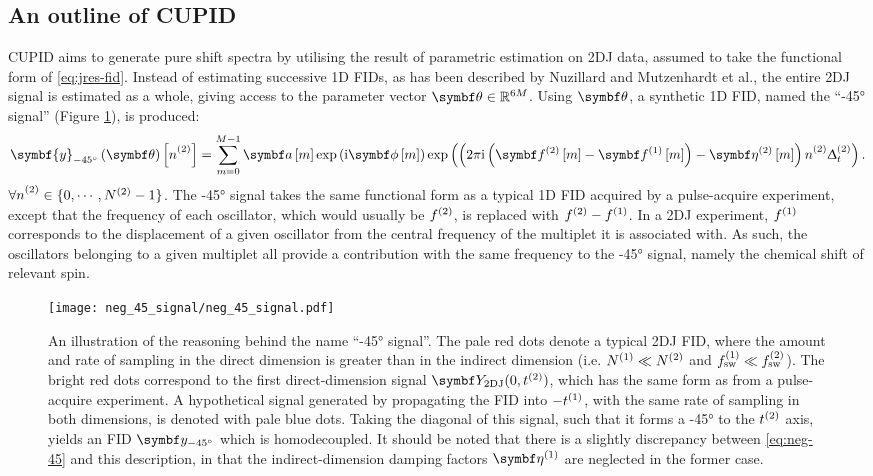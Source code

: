 \subsection{An outline of \acs{CUPID}}
\ac{CUPID} aims to generate pure shift spectra by utilising the result of
parametric estimation on \ac{2DJ} data, assumed to take the functional form of
\eqref{eq:jres-fid}.
Instead of estimating successive \ac{1D} \acp{FID}, as has been described by
Nuzillard and Mutzenhardt et al., the entire \ac{2DJ} signal is estimated as a
whole, giving access to the parameter vector $\bth \in \mathbb{R}^{6M}$. Using
$\bth$, a synthetic \ac{1D} \ac{FID}, named the ``\ang{-45} signal'' (Figure
\ref{fig:neg-45}), is produced:
\begin{equation}
    \symbf{y}_{\ang{-45}}\left(\bth\right)\left[ \ntwo \right] =
        \sum_{m=0}^{M-1} \bdam \exp \left(\iu \bdphim \right)
        \exp\left(
            \left(
                2 \pi \iu \left(\bdftwom - \bdfonem\right)
                - \bdetatwom
            \right) \ntwo \Dttwo
        \right).
    \label{eq:neg-45}
\end{equation}
$\forall \ntwo \in \lbrace 0, \cdots, \Ntwo - 1 \rbrace$. The \ang{-45} signal
takes the same functional form as a typical \ac{1D}
\ac{FID} acquired by a pulse-acquire experiment, except that the frequency of
each oscillator, which would usually be $f^{(2)}$, is replaced with $f^{(2)} -
f^{(1)}$. In a \ac{2DJ} experiment, $f^{(1)}$ corresponds to the displacement of a
given oscillator from the central frequency of the multiplet it is associated
with. As such, the oscillators belonging to a given multiplet all provide
a contribution with the same frequency to the \ang{-45} signal, namely the
chemical shift of relevant spin.
\begin{figure}
    \centering
    \texttt{[image: neg\_45\_signal/neg\_45\_signal.pdf]}
    \caption{
        An illustration of the reasoning behind the name ``\ang{-45}
        signal''. The pale red dots denote a typical \ac{2DJ} \ac{FID}, where
        the amount and rate of sampling in the direct dimension is greater than
        in the indirect dimension (i.e. $N^{(1)} \ll N^{(2)}$ and $f_{\mathrm{sw}}^{(1)} \ll
        f_{\mathrm{sw}}^{(2)}$). The bright red dots correspond to the first direct-dimension
        signal $\bY_{\text{2DJ}}(0, \ttwo)$, which has the same form as
         from a pulse-acquire experiment. A hypothetical signal
        generated by propagating the \ac{FID} into $-t^{(1)}$, with the same rate
        of sampling in both dimensions, is denoted with pale blue dots. Taking
        the diagonal of this signal, such that it forms a \ang{-45} to the
        $t^{(2)}$ axis, yields an \ac{FID} $\by_{\ang{-45}}$  which is
        homodecoupled. It should be noted that there is a slightly discrepancy
        between \eqref{eq:neg-45} and this description, in that the
        indirect-dimension damping factors $\bdetaone$ are neglected in the
        former case.
    }
    \label{fig:neg-45}
\end{figure}


